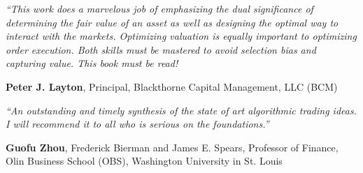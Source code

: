 \pagestyle{empty}

\noindent \emph{``This work does a marvelous job of emphasizing the dual significance of determining the fair value of an asset as well as designing the optimal way to interact with the markets. Optimizing valuation is equally important to optimizing order execution. Both skills must be mastered to avoid selection bias and capturing value. This book must be read!} \par
{%
\begin{flushright}
\begin{minipage}{0.6\textwidth}
\textbf{Peter J. Layton}, Principal, Blackthorne Capital Management, LLC (BCM)
\end{minipage}
\end{flushright} 
\twomedskip
}


\noindent \emph{``An outstanding and timely synthesis of the state of art algorithmic trading ideas. I will recommend it to all who is serious on the foundations.''} \par
{%
\begin{flushright}
\begin{minipage}{0.6\textwidth}
\textbf{Guofu Zhou}, Frederick Bierman and James E. Spears, Professor of Finance, Olin Business School (OBS), Washington University in St. Louis 
\end{minipage}
\end{flushright}
}